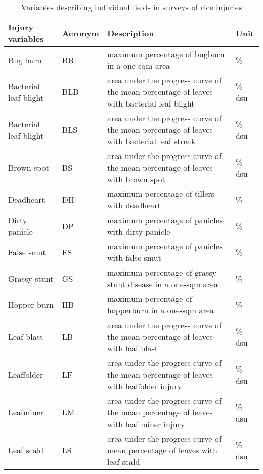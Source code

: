 \begin{landscape}
\begin{table}[!h]
\centering
\caption{Variables describing individual fields in surveys of rice injuries}
\label{table:variable_des}
\begin{tabular}{llll}
\hline
Injury variables              & Acronym & Description                                                                              & Unit  \\
\hline
Bug burn              & BB      & maximum percentage of bugburn in a one-sqm area                                           & \%     \\
Bacterial leaf blight & BLB     & area under the progress curve of the mean percentage of leaves with bacterial leaf blight & \% dsu \\
Bacterial leaf blight & BLS     & area under the progress curve of the mean percentage of leaves with bacterial leaf streak & \% dsu \\
Brown spot            & BS      & area under the progress curve of the mean percentage of leaves with brown spot            & \% dsu \\
Deadheart             & DH      & maximum percentage of tillers with deadheart                                              & \%     \\
Dirty panicle         & DP      & maximum percentage of panicles with dirty panicle                                         & \%     \\
False smut            & FS      & maximum percentage of panicles with false smut                                            & \%     \\
Grassy stunt   & GS      & maximum percentage of grassy stunt disease in a one-sqm area                              & \%     \\
Hopper burn           & HB      & maximum percentage of hopperburn in a one-sqm area                                        & \%     \\
Leaf blast            & LB      & area under the progress curve of the mean percentage of leaves with leaf blast            & \% dsu \\
Leaffolder            & LF      & area under the progress curve of the mean percentage of leaves with leaffolder injury     & \% dsu \\
Leafminer             & LM      & area under the progress curve of the mean percentage of leaves with leaf miner injury     & \% dsu \\
Leaf scald            & LS      & area under the progress curve of mean percentage of leaves with leaf scald                & \% dsu \\

\end{tabular}
\end{table}
\end{landscape}
